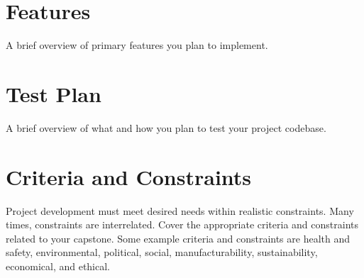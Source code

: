 


\section{Features}

A brief overview of primary features you plan to implement.




\section{Test Plan}

A brief overview of what and how you plan to test your project codebase.




\section{Criteria and Constraints}

Project development must meet desired needs within realistic constraints. Many times, constraints are interrelated. Cover the appropriate criteria and constraints related to your capstone. Some example criteria and constraints are health and safety, environmental, political, social, manufacturability, sustainability, economical, and ethical.

